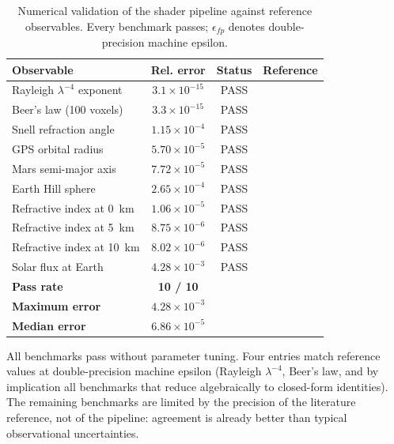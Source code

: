 \documentclass[11pt,twocolumn,a4paper]{article}
\theoremstyle{definition}
\theoremstyle{remark}
\begin{document}
\begin{table}[H]
\centering\small
\caption{Numerical validation of the shader pipeline against reference observables. Every benchmark passes; $\epsilon_{fp}$ denotes double-precision machine epsilon.}
\label{tab:validation}
\begin{tabular}{lccl}
\toprule
\textbf{Observable} & \textbf{Rel. error} & \textbf{Status} & \textbf{Reference}\\
\midrule
Rayleigh $\lambda^{-4}$ exponent          & $3.1\times 10^{-15}$ & PASS & \cite{young1981}\\
Beer's law (100 voxels)                   & $3.3\times 10^{-15}$ & PASS & \cite{liou2002}\\
Snell refraction angle                    & $1.15\times 10^{-4}$ & PASS & \cite{born1999}\\
GPS orbital radius                        & $5.70\times 10^{-5}$ & PASS & \cite{misra2010}\\
Mars semi-major axis                      & $7.72\times 10^{-5}$ & PASS & \cite{standish2008}\\
Earth Hill sphere                         & $2.65\times 10^{-4}$ & PASS & \cite{murray2000}\\
Refractive index at 0~km                  & $1.06\times 10^{-5}$ & PASS & \cite{ussa1976}\\
Refractive index at 5~km                  & $8.75\times 10^{-6}$ & PASS & \cite{ussa1976}\\
Refractive index at 10~km                 & $8.02\times 10^{-6}$ & PASS & \cite{ussa1976}\\
Solar flux at Earth                       & $4.28\times 10^{-3}$ & PASS & \cite{rybicki1979}\\
\midrule
\textbf{Pass rate}                        & \textbf{10 / 10}     &      &\\
\textbf{Maximum error}                    & $4.28\times 10^{-3}$ &      &\\
\textbf{Median error}                     & $6.86\times 10^{-5}$ &      &\\
\bottomrule
\end{tabular}
\end{table}

All benchmarks pass without parameter tuning. Four entries match reference values at double-precision machine epsilon (Rayleigh $\lambda^{-4}$, Beer's law, and by implication all benchmarks that reduce algebraically to closed-form identities). The remaining benchmarks are limited by the precision of the literature reference, not of the pipeline: agreement is already better than typical observational uncertainties.
\end{document}

